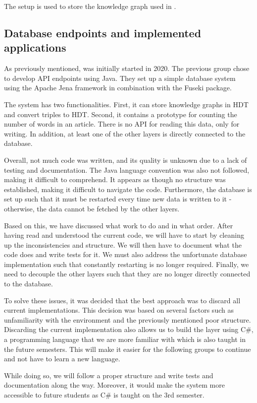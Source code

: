 The setup is used to store the knowledge graph used in \knox{}.

\subsection{Database endpoints and implemented applications}

As previously mentioned, \knox{} was initially started in 2020.
The previous group chose to develop API endpoints using Java.
They set up a simple database system using the Apache Jena framework in combination with the Fuseki package.

The system has two functionalities. 
First, it can store knowledge graphs in HDT and convert triples to HDT.
Second, it contains a prototype for counting the number of words in an article.
There is no API for reading this data, only for writing. 
In addition, at least one of the other layers is directly connected to the database.

Overall, not much code was written, and its quality is unknown due to a lack of testing and documentation.
The Java language convention was also not followed\cite{java_convention}, making it difficult to comprehend.
It appears as though no structure was established, making it difficult to navigate the code. 
Furthermore, the database is set up such that it must be restarted every time new data is written to it - otherwise, the data cannot be fetched by the other layers\cite{knox2020}.

Based on this, we have discussed what work to do and in what order.
After having read and understood the current code, we will have to start by cleaning up the inconsistencies and structure.
We will then have to document what the code does and write tests for it.
We must also address the unfortunate database implementation such that constantly restarting is no longer required.
Finally, we need to decouple the other layers such that they are no longer directly connected to the database.

To solve these issues, it was decided that the best approach was to discard all current implementations. 
This decision was based on several factors such as unfamiliarity with the environment and the previously mentioned poor structure. 
Discarding the current implementation also allows us to build the layer using C\#, a programming language that we are more familiar with which is also taught in the future semesters. 
This will make it easier for the following groups to continue and not have to learn a new language.

While doing so, we will follow a proper structure and write tests and documentation along the way. 
Moreover, it would make the system more accessible to future students as C\# is taught on the 3rd semester.